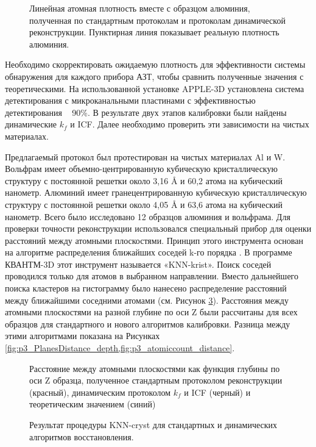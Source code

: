 \begin{figure}[htb]
	\caption{Линейная атомная плотность вместе с образцом алюминия, полученная по стандартным протоколам и протоколам динамической реконструкции. Пунктирная линия показывает реальную плотность алюминия.}
	\label{fig:p3_Density_vs_depth}
\end{figure}

Необходимо скорректировать ожидаемую плотность для эффективности системы обнаружения для каждого прибора АЗТ, чтобы сравнить полученные значения с теоретическими. На использованной установке APPLE-3D установлена система детектирования с микроканальными пластинами с эффективностью детектирования ~ 90\%. В результате двух этапов калибровки были найдены динамические $k_f$ и ICF. Далее необходимо проверить эти зависимости на чистых материалах.

Предлагаемый протокол был протестирован на чистых материалах Al и W. Вольфрам имеет объемно-центрированную кубическую кристаллическую структуру с постоянной решетки около 3,16 \r{A} и 60,2 атома на кубический нанометр. Алюминий имеет гранецентрированную кубическую кристаллическую структуру с постоянной решетки около 4,05 \r{A} и 63,6 атома на кубический нанометр. Всего было исследовано 12 образцов алюминия и вольфрама. Для проверки точности реконструкции использовался специальный прибор для оценки расстояний между атомными плоскостями. Принцип этого инструмента основан на алгоритме распределения ближайших соседей k-го порядка \cite{GaultBOOK}. В программе КВАНТМ-3D этот инструмент называется «KNN-krist». Поиск соседей проводился только для атомов в выбранном направлении. Вместо дальнейшего поиска кластеров на гистограмму было нанесено распределение расстояний между ближайшими соседними атомами (см. Рисунок \cref{fig:p3_atomiccount_distance}). Расстояния между атомными плоскостями на разной глубине по оси Z были рассчитаны для всех образцов для стандартного и нового алгоритмов калибровки. Разница между этими алгоритмами показана на Рисунках \cref{fig:p3_PlanesDistance_depth,fig:p3_atomiccount_distance}.

\begin{figure}[htb]
	\caption{Расстояние между атомными плоскостями как функция глубины по оси Z образца, полученное стандартным протоколом реконструкции (красный), динамическим протоколом $k_f$ и ICF (черный) и теоретическим значением (синий)}
	\label{fig:p3_PlanesDistance_depth}
\end{figure}
\begin{figure}[htb]
	\caption{Результат процедуры KNN-cryst для стандартных и динамических алгоритмов восстановления.}
	\label{fig:p3_atomiccount_distance}
\end{figure}

